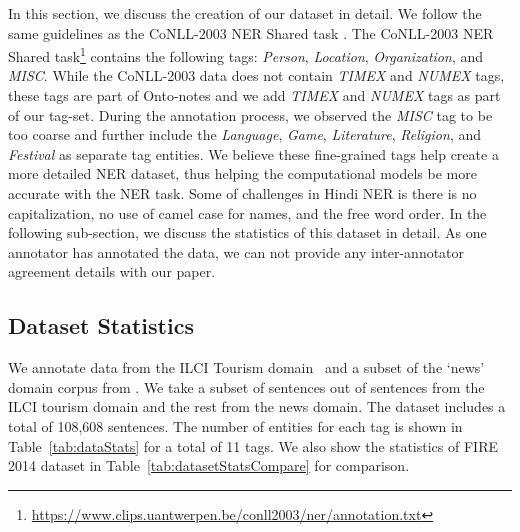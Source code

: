 \documentclass[10pt, a4paper]{article}
\begin{document}
In this section, we discuss the creation of our dataset in detail. We follow the same guidelines as the CoNLL-2003 NER Shared task \cite{TjongKimSang:2003:ICS:1119176.1119195}. The CoNLL-2003 NER Shared task\footnote{\url{https://www.clips.uantwerpen.be/conll2003/ner/annotation.txt}} contains the following tags: \textit{Person}, \textit{Location}, \textit{Organization}, and \textit{MISC}. While the CoNLL-2003 data does not contain \textit{TIMEX} and \textit{NUMEX} tags, these tags are part of Onto-notes \cite{pradhan-etal-2013-towards} and we add \textit{TIMEX} and \textit{NUMEX} tags as part of our tag-set. During the annotation process, we observed the \textit{MISC} tag to be too coarse and further include the \textit{Language}, \textit{Game}, \textit{Literature}, \textit{Religion}, and \textit{Festival} as separate tag entities. We believe these fine-grained tags help create a more detailed NER dataset, thus helping the computational models be more accurate with the NER task. Some of challenges in Hindi NER is there is no capitalization, no use of camel case for names, and the free word order.
In the following sub-section, we discuss the statistics of this dataset in detail. As one annotator has annotated the data, we can not provide any inter-annotator agreement details with our paper. 

\begin{table}[!t]
\centering
{}
\caption{\textbf{HiNER} dataset statistics in terms of the number of sentences (\#sentences), number of words (\#words), and the splits created for the Hindi NER task}
\label{tab:dataSplit}
\end{table}

\subsection{Dataset Statistics}

We annotate data from the ILCI Tourism domain~\cite{jha} and a subset of the `news' domain corpus from . We take a subset of  sentences out of  sentences from the ILCI tourism domain and the rest from the news domain. The dataset includes a total of 108,608 sentences. The number of entities for each tag is shown in Table~\ref{tab:dataStats} for a total of 11 tags. We also show the statistics of FIRE 2014 dataset in Table~\ref{tab:datasetStatsCompare} for comparison.
\end{document}
